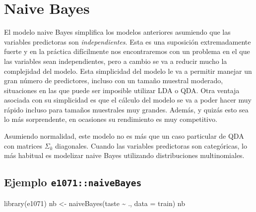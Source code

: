 \documentclass[
]{book}
\newenvironment{Shaded}{\begin{snugshade}}{\end{snugshade}}
\newcommand{\AttributeTok}[1]{\textcolor[rgb]{0.77,0.63,0.00}{#1}}
\newcommand{\FunctionTok}[1]{\textcolor[rgb]{0.00,0.00,0.00}{#1}}
\newcommand{\NormalTok}[1]{#1}
\newcommand{\OtherTok}[1]{\textcolor[rgb]{0.56,0.35,0.01}{#1}}
\newcommand{\SpecialCharTok}[1]{\textcolor[rgb]{0.00,0.00,0.00}{#1}}
\theoremstyle{break}
\theoremstyle{definition}
\theoremstyle{definition}
\theoremstyle{definition}
\theoremstyle{definition}
\theoremstyle{remark}
\begin{document}
\begin{Shaded}
\end{Shaded}

\hypertarget{naive-bayes}{%
\section{Naive Bayes}\label{naive-bayes}}

El modelo naive Bayes simplifica los modelos anteriores asumiendo que las variables predictoras son \emph{independientes}. Esta es una suposición extremadamente fuerte y en la práctica difícilmente nos encontraremos con un problema en el que las variables sean independientes, pero a cambio se va a reducir mucho la complejidad del modelo. Esta simplicidad del modelo le va a permitir manejar un gran número de predictores, incluso con un tamaño muestral moderado, situaciones en las que puede ser imposible utilizar LDA o QDA. Otra ventaja asociada con su simplicidad es que el cálculo del modelo se va a poder hacer muy rápido incluso para tamaños muestrales muy grandes. Además, y quizás esto sea lo más sorprendente, en ocasiones su rendimiento es muy competitivo.

Asumiendo normalidad, este modelo no es más que un caso particular de QDA con matrices \(\Sigma_k\) diagonales. Cuando las variables predictoras son categóricas, lo más habitual es modelizar naive Bayes utilizando distribuciones multinomiales.

\hypertarget{ejemplo-e1071naivebayes}{%
\subsection{\texorpdfstring{Ejemplo \texttt{e1071::naiveBayes}}{Ejemplo e1071::naiveBayes}}\label{ejemplo-e1071naivebayes}}

\begin{Shaded}
\begin{Highlighting}[]
\FunctionTok{library}\NormalTok{(e1071)}
\NormalTok{nb }\OtherTok{\textless{}{-}} \FunctionTok{naiveBayes}\NormalTok{(taste }\SpecialCharTok{\textasciitilde{}}\NormalTok{ ., }\AttributeTok{data =}\NormalTok{ train)}
\NormalTok{nb}
\end{Highlighting}
\end{Shaded}
\end{document}
